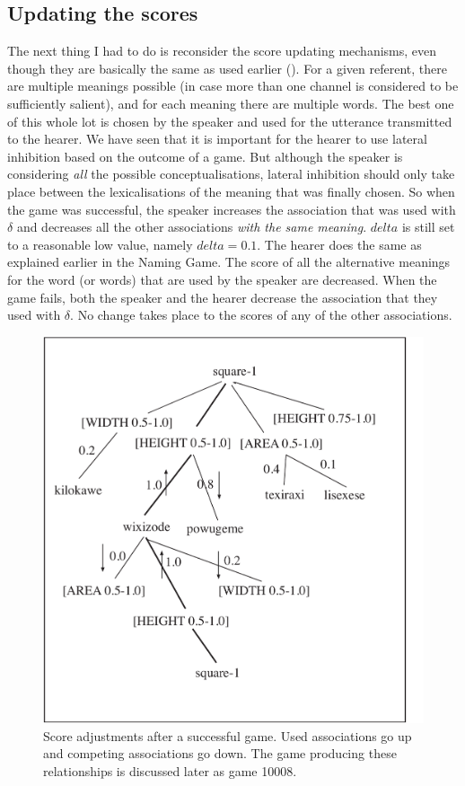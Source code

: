 \subsection{Updating the scores}

The next thing I had to do is reconsider the score
updating mechanisms, even though they are basically 
the same as used earlier (). 
For a given referent, there are multiple meanings possible
(in case more than one channel is considered to 
be sufficiently salient), and
for each meaning there are multiple words. The best 
one of this whole lot is chosen by the speaker and used
for the utterance transmitted to the hearer. We have 
seen that it is important for the hearer to use lateral
inhibition based on the outcome of a game. But although 
the speaker is considering {\itshape all} the possible 
conceptualisations, lateral
inhibition should only take place between the 
lexicalisations of the meaning that was finally chosen. 
So when the game was successful, 
the speaker increases the association that was used with $\delta$
and decreases all the other associations
{\itshape with the same meaning}. $delta$ is still set to a reasonable
low value, namely $delta = 0.1$. 
The hearer does the same as explained earlier in 
the Naming Game. The score of all
the alternative meanings for the word (or words) 
that are used by the speaker are decreased. 
When the game fails, both the speaker and the hearer 
decrease the association that they used with $\delta$. No
change takes place to the scores of any of the 
other associations. 


\begin{figure}[htbp]
  \centerline{\includegraphics[width=.50\textwidth]{chap6/figs/incr-decr2.pdf}}
\caption{\label{incr-decr2}Score adjustments after a successful game. Used 
associations go up and competing associations go down.
The game producing these relationships is discussed
later as game 10008.}
\end{figure}


